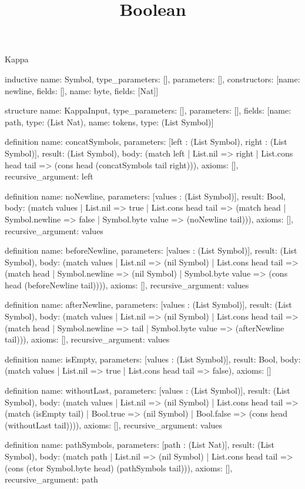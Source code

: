 \begin{lexlean}{Kappa}
\title{Boolean}
\begin{semanticmodule}
inductive{
  name: Symbol,
  type_parameters: [],
  parameters: [],
  constructors: [{name: newline, fields: []}, {name: byte, fields: [Nat]}]
}

structure{
  name: KappaInput,
  type_parameters: [],
  parameters: [],
  fields: [{name: path, type: (List Nat)}, {name: tokens, type: (List Symbol)}]
}

definition{
  name: concatSymbols,
  parameters: [left : (List Symbol), right : (List Symbol)],
  result: (List Symbol),
  body: (match left
    | List.nil => right
    | List.cons head tail => (cons head (concatSymbols tail right))),
  axioms: [],
  recursive_argument: left
}

definition{
  name: noNewline,
  parameters: [values : (List Symbol)],
  result: Bool,
  body: (match values
    | List.nil => true
    | List.cons head tail => (match head
      | Symbol.newline => false
      | Symbol.byte value => (noNewline tail))),
  axioms: [],
  recursive_argument: values
}

definition{
  name: beforeNewline,
  parameters: [values : (List Symbol)],
  result: (List Symbol),
  body: (match values
    | List.nil => (nil Symbol)
    | List.cons head tail => (match head
      | Symbol.newline => (nil Symbol)
      | Symbol.byte value => (cons head (beforeNewline tail)))),
  axioms: [],
  recursive_argument: values
}

definition{
  name: afterNewline,
  parameters: [values : (List Symbol)],
  result: (List Symbol),
  body: (match values
    | List.nil => (nil Symbol)
    | List.cons head tail => (match head
      | Symbol.newline => tail
      | Symbol.byte value => (afterNewline tail))),
  axioms: [],
  recursive_argument: values
}

definition{
  name: isEmpty,
  parameters: [values : (List Symbol)],
  result: Bool,
  body: (match values | List.nil => true | List.cons head tail => false),
  axioms: []
}

definition{
  name: withoutLast,
  parameters: [values : (List Symbol)],
  result: (List Symbol),
  body: (match values
    | List.nil => (nil Symbol)
    | List.cons head tail => (match (isEmpty tail)
      | Bool.true => (nil Symbol)
      | Bool.false => (cons head (withoutLast tail)))),
  axioms: [],
  recursive_argument: values
}

definition{
  name: pathSymbols,
  parameters: [path : (List Nat)],
  result: (List Symbol),
  body: (match path
    | List.nil => (nil Symbol)
    | List.cons head tail => (cons (ctor Symbol.byte head) (pathSymbols tail))),
  axioms: [],
  recursive_argument: path
}


\end{semanticmodule}
\end{lexlean}
